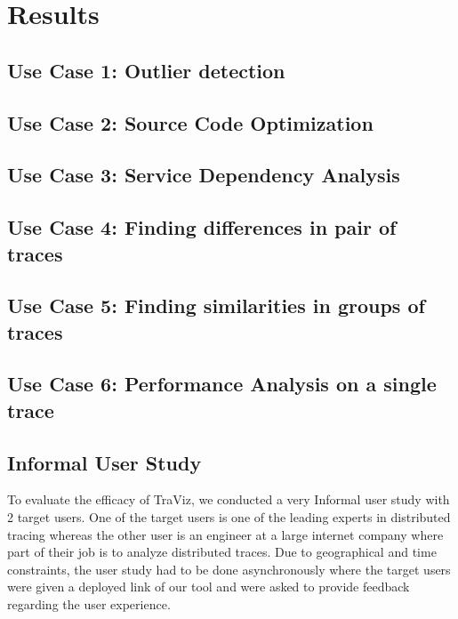 \section{Results}

\subsection{Use Case 1: Outlier detection}

\subsection{Use Case 2: Source Code Optimization}

\subsection{Use Case 3: Service Dependency Analysis}

\subsection{Use Case 4: Finding differences in pair of traces}

\subsection{Use Case 5: Finding similarities in groups of traces}

\subsection{Use Case 6: Performance Analysis on a single trace}

\subsection{Informal User Study}

To evaluate the efficacy of TraViz, we conducted a very Informal user study
with 2 target users. One of the target users is one of the leading experts in distributed
tracing whereas the other user is an engineer at a large internet company where part of
their job is to analyze distributed traces. Due to geographical and time constraints,
the user study had to be done asynchronously where the target users were given
a deployed link of our tool and were asked to provide feedback regarding the user
experience.

